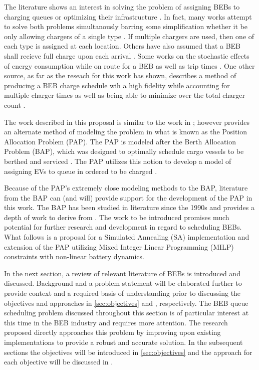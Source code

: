 \documentclass[ee,thesis]{usuthesis}
\begin{document}
The literature shows an interest in solving the problem of assigning BEBs to charging queues or optimizing their
infrastructure \cite{wei-2018-optim-spatio,sebastiani-2016-evaluat-elect,hoke-2014-accoun-lithium,wang-2017-elect-vehic}. In fact, many works attempt to solve both problems simultanously
barring some simplification whether it be only allowing chargers of a single type
\cite{he-2020-optim-charg,tang-2019-robus-sched}. If multiple chargers are used, then one of each type is assigned at
each location. Others have also assumed that a BEB shall recieve full charge upon each arrival
\cite{wei-2018-optim-spatio,wang-2017-elect-vehic,zhou-2020-bi-objec,wang-2017-optim-rechar}. Some works on the
stochastic effects of energy consumption while on route for a BEB as well as trip times \cite{zhou-2020-collab-optim,bie-2021-optim-elect}. One other source, as far as the reseach for this work has shown, describes a method of producing
a BEB charge schedule wih a high fidelity while accounting for multiple charger times as well as being able to minimize
over the total charger count \cite{whitaker-2023-a-network}.

The work described in this proposal is similar to the work in \cite{whitaker-2023-a-network}; however provides an
alternate method of modeling the problem in what is known as the Position Allocation Problem (PAP). The PAP is modeled
after the Berth Allocation Problem (BAP), which was designed to optimally schedule cargo vessels to be berthed and
serviced \cite{buhrkal-2011-model-discr,imai-2001-dynam-berth,frojan-2015-contin-berth}. The PAP utilizes this
notion to develop a model of assigning EVs to queue in ordered to be charged \cite{qarebagh-2019-optim-sched}.

Because of the PAP's extremely close modeling methods to the BAP, literature from the BAP can (and will) provide support
for the development of the PAP in this work. The BAP has been studied in literature since the 1990s and provides a depth
of work to derive from \cite{rodrigues-2022-berth}. The work to be introduced promises much potential for further
research and development in regard to scheduling BEBs. What follows is a proposal for a Simulated Annealing (SA)
implementation and extension of the PAP utilizing Mixed Integer Linear Programming (MILP) constraints with non-linear
battery dynamics.

In the next section, a review of relevant literature of BEBs is introduced and discussed. Background and a problem
statement will be elaborated further to provide context and a required basis of understanding prior to discussing the
objectives and approaches in \ref{sec:objectives} and , respectively. The BEB queue scheduling problem discussed
throughout this section is of particular interest at this time in the BEB industry and requires more attention. The
research proposed directly approaches this problem by improving upon existing implementations to provide a robust and
accurate solution. In the subsequent sections the objectives will be introduced in \ref{sec:objectives} and the approach for
each objective will be discussed in .
\end{document}

